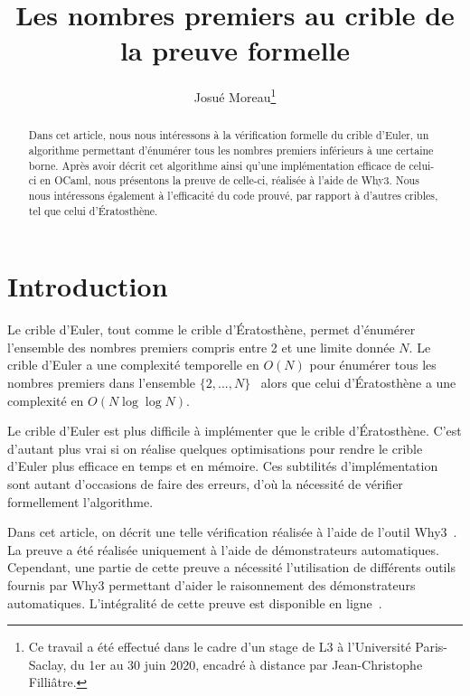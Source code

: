 \documentclass[a4paper]{easychair}
\begin{document}
\title{Les nombres premiers au crible de la preuve formelle}
\author{Josué Moreau\thanks{Ce travail a été effectué dans le cadre
    d'un stage de L3 à l'Université Paris-Saclay, du 1er au 30 juin
    2020, encadré à distance par Jean-Christophe Filliâtre.}}
\maketitle

\begin{abstract}
  Dans cet article, nous nous intéressons à la vérification formelle du
  crible d'Euler, un algorithme permettant d'énumérer tous les nombres
  premiers inférieurs à une certaine borne. Après avoir décrit cet
  algorithme ainsi qu'une implémentation efficace de celui-ci en OCaml,
  nous présentons la preuve de celle-ci, réalisée à l'aide de Why3.
  Nous nous intéressons également à l'efficacité du code prouvé, par
  rapport à d'autres cribles, tel que celui d'Ératosthène.
\end{abstract}

\section{Introduction}

Le crible d'Euler, tout comme le crible d'Ératosthène, permet d'énumérer
l'ensemble des nombres premiers compris entre 2 et une limite donnée $N$.
Le crible d'Euler a une complexité temporelle en $O(N)$ pour énumérer tous les
nombres premiers dans l'ensemble $\{2,...,N\}$~\cite{crible-euler} alors que
celui d'Ératosthène a une complexité en $O(N \log\log N)$.

Le crible d'Euler est plus difficile à implémenter que le crible d'Ératosthène.
C'est d'autant plus vrai si on réalise quelques optimisations pour
rendre le crible d'Euler plus efficace en temps et en mémoire.
Ces subtilités d'implémentation sont autant d'occasions de faire des erreurs,
d'où la nécessité de vérifier formellement l'algorithme.

Dans cet article, on décrit une telle vérification réalisée à l'aide de
l'outil Why3~\cite{why3}.
La preuve a été réalisée uniquement à l'aide de démonstrateurs automatiques.
Cependant, une partie de cette preuve a nécessité l'utilisation de différents
outils fournis par Why3 permettant d'aider le raisonnement des démonstrateurs
automatiques.
L'intégralité de cette preuve est disponible en ligne~\cite{mapreuve}.
\end{document}
